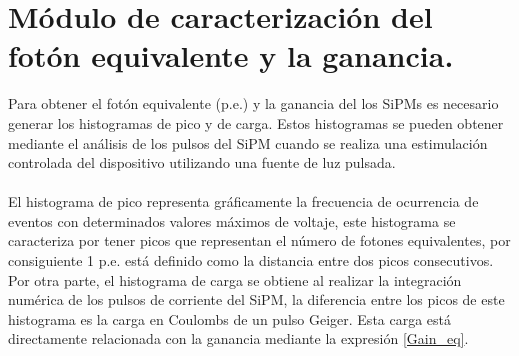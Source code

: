 \section{Módulo de caracterización del fotón equivalente y la ganancia.}
Para obtener el fotón equivalente (p.e.) y la ganancia del los SiPMs es necesario generar los histogramas de pico y de carga. Estos histogramas se pueden obtener mediante el análisis de los pulsos del SiPM cuando se realiza una estimulación controlada del dispositivo utilizando una fuente de luz pulsada.\\ \\
El histograma de pico representa gráficamente la frecuencia de ocurrencia de eventos con determinados valores máximos de voltaje, este histograma se caracteriza por tener picos que representan el número de fotones equivalentes, por consiguiente 1 p.e. está definido como la distancia entre dos picos consecutivos. Por otra parte, el histograma de carga se obtiene al realizar la integración numérica de los pulsos de corriente del SiPM, la diferencia entre los picos de este histograma es la carga en Coulombs de un pulso Geiger. Esta carga está directamente relacionada con la ganancia mediante la expresión \ref{Gain_eq}.       
